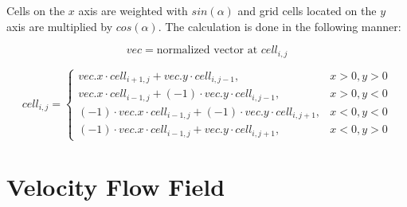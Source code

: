 \documentclass[12pt, titlepage]{article}
\begin{document}
Cells on the $x$ axis are weighted with $sin(\alpha)$ and grid cells located on the $y$ axis are multiplied by $cos(\alpha)$. The calculation is done in the following manner:

\[
	vec = \text{normalized vector at }cell_{i, j}
\]

\[
	cell_{i, j} = \begin{cases}
	vec.x \cdot cell_{i+1, j} + vec.y \cdot cell_{i, j-1}, & x > 0, y > 0 \\
	vec.x \cdot cell_{i-1, j} + (-1)\cdot vec.y \cdot cell_{i, j-1}, & x > 0, y < 0 \\
	(-1) \cdot vec.x \cdot cell_{i-1, j} + (-1) \cdot vec.y \cdot cell_{i, j+1}, & x < 0, y < 0 \\
	(-1) \cdot vec.x \cdot cell_{i-1, j} + vec.y \cdot cell_{i, j+1}, & x < 0, y > 0
	\end{cases}
\]

\section{Velocity Flow Field}
\end{document}
